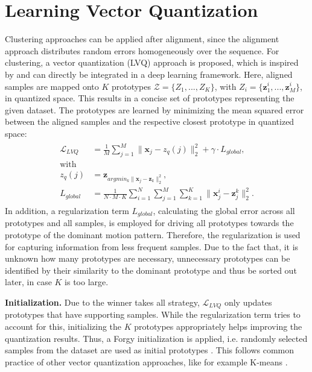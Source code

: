 \documentclass[letterpaper, 10 pt, conference]{ieeeconf}  %
\begin{document}
\section{Learning Vector Quantization} 
\label{sec:vq}
Clustering approaches can be applied after alignment, since the alignment approach distributes random errors homogeneously over the sequence. 
For clustering, a vector quantization (LVQ) approach is proposed, which is inspired by \cite{oord2017neural} and can directly be integrated in a deep learning framework.
Here, aligned samples are mapped onto $K$ prototypes $\mathcal{Z} = \{Z_1, ..., Z_K\}$, with $Z_i = \{\mathbf{z}^i_1, ..., \mathbf{z}^i_M\}$, in quantized space.
This results in a concise set of prototypes representing the given dataset.
The prototypes are learned by minimizing the mean squared error between the aligned samples and the respective closest prototype in quantized space:
\begin{align}
\begin{split}
	\mathcal{L}_{LVQ} &= \frac{1}{M} \sum^M_{j=1} \|\mathbf{x}_j - z_q(j)\|^2_2 + \gamma \cdot L_{global}, \\
	\text{with} \\
	z_q(j) &= \mathbf{z}_{argmin_k \|\mathbf{x}_j - \mathbf{z}_k\|^2_2}, \\
	L_{global} &= \frac{1}{N \cdot M \cdot K} \sum_{i=1}^{N}\sum_{j=1}^{M}\sum_{k=1}^{K} \| \mathbf{x}^i_j - \mathbf{z}^k_j \|^2_2.
\end{split}
\end{align}
In addition, a regularization term $L_{global}$, calculating the global error across all prototypes and all samples, is employed for driving all prototypes towards the prototype of the dominant motion pattern. 
Therefore, the regularization is used for capturing information from less frequent samples.
Due to the fact that, it is unknown how many prototypes are necessary, unnecessary prototypes can be identified by their similarity to the dominant prototype and thus be sorted out later, in case $K$ is too large.

\textbf{Initialization.} Due to the winner takes all strategy, $\mathcal{L}_{LVQ}$ only updates prototypes that have supporting samples.
While the regularization term tries to account for this, initializing the $K$ prototypes appropriately helps improving the quantization results.
Thus, a Forgy initialization is applied, i.e. randomly selected samples from the dataset are used as initial prototypes \cite{pena1999empirical}. 
This follows common practice of other vector quantization approaches, like for example K-means \cite{lloyd1982kmeans}. 
\end{document}
